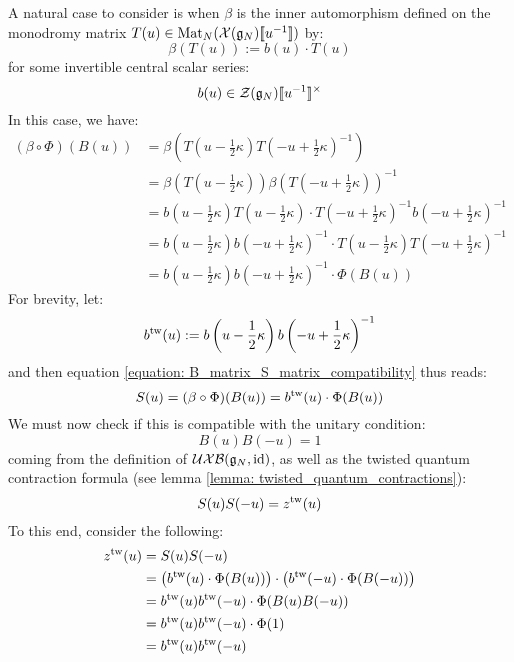         A natural case to consider is when $\beta$ is the inner automorphism defined on the monodromy matrix $T(u) \in \operatorname{Mat}_N( \mathcal{X}(\mathfrak{g}_N)[\![u^{-1}]\!] )$ by:
            $$\beta( T(u) ) := b(u) \cdot T(u)$$
        for some invertible central scalar series:
            $$b(u) \in \calZ(\g_N)[\![u^{-1}]\!]^{\x}$$
        In this case, we have:
            $$
                \begin{aligned}
                    (\beta \circ \Phi)( B(u) ) & = \beta\left( T\left(u - \frac12 \kappa\right) T\left(-u + \frac12 \kappa\right)^{-1} \right)
                    \\
                    & = \beta\left( T\left(u - \frac12 \kappa\right) \right) \beta\left( T\left(-u + \frac12 \kappa\right) \right)^{-1}
                    \\
                    & = b\left(u - \frac12 \kappa\right) T\left(u - \frac12 \kappa\right) \cdot T\left(-u + \frac12 \kappa\right)^{-1} b\left(-u + \frac12 \kappa\right)^{-1}
                    \\
                    & = b\left(u - \frac12 \kappa\right) b\left(-u + \frac12 \kappa\right)^{-1} \cdot T\left(u - \frac12 \kappa\right) T\left(-u + \frac12 \kappa\right)^{-1}
                    \\
                    & = b\left(u - \frac12 \kappa\right) b\left(-u + \frac12 \kappa\right)^{-1} \cdot \Phi( B(u) )
                \end{aligned}
            $$
        For brevity, let:
            $$b^{\mathrm{tw}}(u) := b\left(u - \frac12 \kappa\right) b\left(-u + \frac12 \kappa\right)^{-1}$$
        and then equation \eqref{equation: B_matrix_S_matrix_compatibility} thus reads:
            $$S(u) = (\beta \circ \Phi)( B(u) ) = b^{\mathrm{tw}}(u) \cdot \Phi( B(u) )$$
        We must now check if this is compatible with the unitary condition:
            $$B(u) B(-u) = 1$$
        coming from the definition of $\mathcal{UXB}(\mathfrak{g}_N, \mathrm{id})$, as well as the twisted quantum contraction formula (see lemma \ref{lemma: twisted_quantum_contractions}):
            $$S(u) S(-u) = z^{\mathrm{tw}}(u)$$
        To this end, consider the following:
            $$
                \begin{aligned}
                    z^{\mathrm{tw}}(u) & = S(u) S(-u)
                    \\
                    & = \left( b^{\mathrm{tw}}(u) \cdot \Phi( B(u) ) \right) \cdot \left( b^{\mathrm{tw}}(-u) \cdot \Phi( B(-u) ) \right)
                    \\
                    & = b^{\mathrm{tw}}(u) b^{\mathrm{tw}}(-u) \cdot \Phi( B(u) B(-u) )
                    \\
                    & = b^{\mathrm{tw}}(u) b^{\mathrm{tw}}(-u) \cdot \Phi(1)
                    \\
                    & = b^{\mathrm{tw}}(u) b^{\mathrm{tw}}(-u)
                \end{aligned}
            $$
